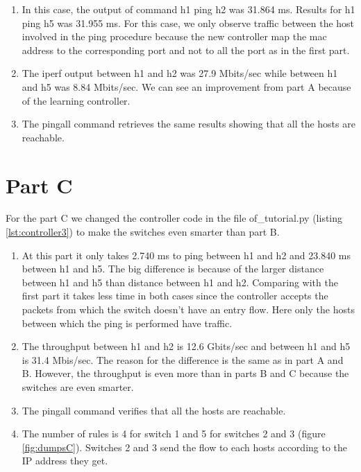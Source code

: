 \documentclass[a4paper,12pt]{article}
\begin{document}

\begin{enumerate}
\item In this case, the output of command h1 ping h2 was 31.864 ms. Results for h1 ping h5 was 31.955 ms.  For this case, we only observe traffic between the host involved in the ping procedure because the new controller map the mac address to the corresponding port and not to all the port as in the first part.
\item The iperf output between h1 and h2 was 27.9 Mbits/sec while between h1 and h5 was 8.84 Mbits/sec.  We can see an improvement from part A because of the learning controller.
\item The pingall command retrieves the same results showing that all the hosts are reachable.
\end{enumerate}

\section*{Part C}
For the part C we changed the controller code in the file of\_tutorial.py (listing \ref{lst:controller3}) to make the switches even smarter than part B. 


\begin{enumerate}
\item At this part it only takes 2.740 ms to ping between h1 and h2 and 23.840 ms between h1 and h5. The big difference is because of the larger distance between h1 and h5 than distance between h1 and h2. Comparing with the first part it takes less time in both cases since the controller accepts the packets from which the switch doesn't have an entry flow. Here only the hosts between which the ping is performed have traffic. 
\item The throughput between h1 and h2 is 12.6 Gbits/sec and between h1 and h5 is 31.4 Mbis/sec. The reason for the difference is the same as in part A and B. However, the throughput is even more than in parts B and C because the switches are even smarter. 
\item The pingall command verifies that all the hosts are reachable. 
\item The number of rules is 4 for switch 1 and 5 for switches 2 and 3 (figure \ref{fig:dumpsC}). Switches 2 and 3 send the flow to each hosts according to the IP address they get.    
\end{enumerate}
\end{document}
